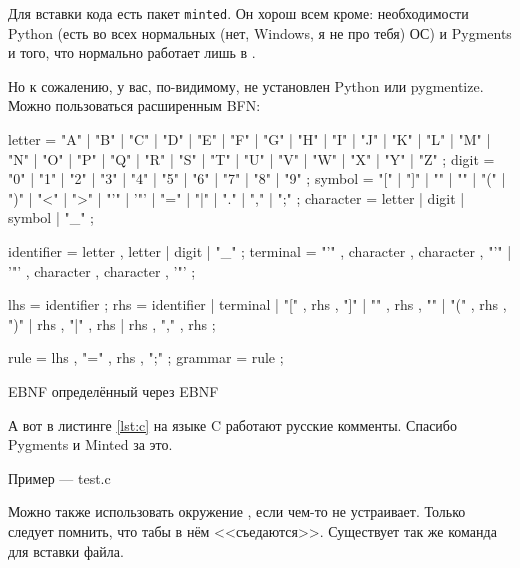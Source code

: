 
\else

    Для вставки кода есть пакет \texttt{minted}. Он хорош всем кроме: необходимости Python (есть во всех нормальных (нет, Windows, я не про тебя) ОС) и Pygments и того, что нормально работает лишь в \XeLaTeX.

    \ifdefined\NoMinted
        Но к сожалению, у вас, по-видимому, не установлен Python или pygmentize.
    \else
        Можно пользоваться расширенным BFN:

        \begin{listing}[H]
            \begin{ebnfcode}
                letter = "A" | "B" | "C" | "D" | "E" | "F" | "G"
                | "H" | "I" | "J" | "K" | "L" | "M" | "N"
                | "O" | "P" | "Q" | "R" | "S" | "T" | "U"
                | "V" | "W" | "X" | "Y" | "Z" ;
                digit = "0" | "1" | "2" | "3" | "4" | "5" | "6" | "7" | "8" | "9" ;
                symbol = "[" | "]" | "{" | "}" | "(" | ")" | "<" | ">"
                | "'" | '"' | "=" | "|" | "." | "," | ";" ;
                character = letter | digit | symbol | "_" ;

                identifier = letter , { letter | digit | "_" } ;
                terminal = "'" , character , { character } , "'"
                | '"' , character , { character } , '"' ;

                lhs = identifier ;
                rhs = identifier
                | terminal
                | "[" , rhs , "]"
                | "{" , rhs , "}"
                | "(" , rhs , ")"
                | rhs , "|" , rhs
                | rhs , "," , rhs ;

                rule = lhs , "=" , rhs , ";" ;
                grammar = { rule } ;
            \end{ebnfcode}
            \caption{EBNF определённый через EBNF}
            \label{lst:ebnf}
        \end{listing}

        А вот в листинге \ref{lst:c} на языке C работают русские комменты. Спасибо Pygments и Minted за это.

        \begin{listing}[H]
            \caption{Пример — test.c}
        \end{listing}
        \label{lst:c}

    \fi
\fi

Можно также использовать окружение , если  чем-то не
устраивает. Только следует помнить, что табы в нём <<съедаются>>. Существует так же команда  для вставки файла.


